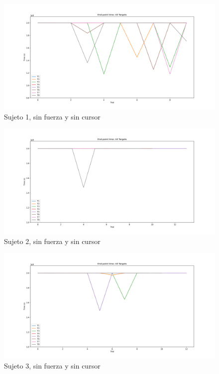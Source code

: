 \documentclass[a4paper,11pt, oneside]{book}
\begin{document}
\begin{figure}[H]
	\includegraphics[width=\linewidth]{sujeto1/no_force_no_cursor/evolution_time}
	\caption{Sujeto 1, sin  fuerza y sin cursor}
	\label{1-3-4}
\end{figure}
\begin{figure}[H]
	\includegraphics[width=\linewidth]{sujeto2/no_force_no_cursor/evolution_time}
	\caption{Sujeto 2, sin  fuerza y sin cursor}
	\label{2-3-4}
\end{figure}
\begin{figure}[H]
	\includegraphics[width=\linewidth]{sujeto3/no_force_no_cursor/evolution_time}
	\caption{Sujeto 3, sin  fuerza y sin cursor}
	\label{3-3-4}
\end{figure}
\end{document}
